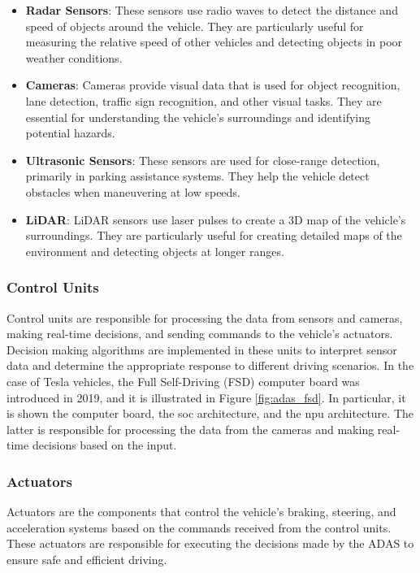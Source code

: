 \begin{itemize}
    \item \textbf{Radar Sensors}: These sensors use radio waves to detect the 
    distance and speed of objects around the vehicle. They are particularly 
    useful for measuring the relative speed of other vehicles and detecting 
    objects in poor weather conditions.
    
    \item \textbf{Cameras}: Cameras provide visual data that is used for object 
    recognition, lane detection, traffic sign recognition, and other visual 
    tasks. They are essential for understanding the vehicle's surroundings and 
    identifying potential hazards.
    
    \item \textbf{Ultrasonic Sensors}: These sensors are used for close-range 
    detection, primarily in parking assistance systems. They help the vehicle 
    detect obstacles when maneuvering at low speeds.
    
    \item \textbf{LiDAR}: LiDAR sensors use laser pulses to create a 3D map of 
    the vehicle's surroundings. They are particularly useful for creating 
    detailed maps of the environment and detecting objects at longer ranges.
\end{itemize}

\subsubsection*{Control Units}
Control units are responsible for processing the data from sensors and cameras, 
making real-time decisions, and sending commands to the vehicle's actuators.
Decision making algorithms are implemented in these units to interpret sensor 
data and determine the appropriate response to different driving scenarios.
In the case of Tesla vehicles, the Full Self-Driving (FSD) computer board 
was introduced in 2019, and it is illustrated in Figure \ref{fig:adas_fsd}.
In particular, it is shown the computer board, the \acf{soc} architecture, and the 
\acf{npu} architecture. The latter is responsible for processing the data 
from the cameras and making real-time decisions based on the input.

\subsubsection*{Actuators}
Actuators are the components that control the vehicle's braking, steering, and 
acceleration systems based on the commands received from the control units. 
These actuators are responsible for executing the decisions made by the ADAS 
to ensure safe and efficient driving.

